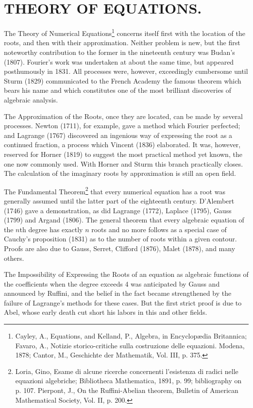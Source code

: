 \documentclass[oneside]{book}
\begin{document}
\chapter{THEORY OF EQUATIONS.}

The Theory of Numerical Equations\footnote{Cayley, A., Equations,
and Kelland, P., Algebra, in Encyclop\ae{}dia Britannica; Favaro, A.,
Notizie storico-critiche sulla costruzione delle equazioni. Modena,
1878; Cantor, M., Geschichte der Mathematik, Vol. III, p. 375.}
concerns itself first with the location of the roots, and then with
their approximation. Neither problem is new, but the first
noteworthy contribution to the former in the nineteenth century was
Budan's (1807). Fourier's work was undertaken at about the same
time, but appeared posthumously in 1831. All processes were,
however, exceedingly cumbersome until Sturm (1829) communicated to
the French Academy the famous theorem which bears his name and which
constitutes one of the most brilliant discoveries of algebraic
analysis.

The Approximation of the Roots, once they are located, can be made
by several processes. Newton (1711), for example, gave a method
which Fourier perfected; and Lagrange (1767) discovered an ingenious
way of expressing the root as a continued fraction, a process which
Vincent (1836) elaborated. It was, however, reserved for Horner
(1819) to suggest the most practical method yet known, the one now
commonly used. With Horner and Sturm this branch practically
closes. The calculation of the imaginary roots by approximation is
still an open field.

The Fundamental Theorem\footnote{Loria, Gino, Esame di alcune
ricerche concernenti l'esistenza di radici nelle equazioni
algebriche; Bibliotheca Mathematica, 1891, p. 99; bibliography on
p. 107. Pierpont, J., On the Ruffini-Abelian theorem, Bulletin of
American Mathematical Society, Vol. II, p. 200.} that every
numerical equation has a root was generally assumed until the latter
part of the eighteenth century. D'Alembert (1746) gave a
demonstration, as did Lagrange (1772), Laplace (1795), Gauss (1799)
and Argand (1806). The general theorem that every algebraic equation
of the $n$th degree has exactly $n$ roots and no more follows as a
special case of Cauchy's proposition (1831) as to the number of
roots within a given contour. Proofs are also due to Gauss, Serret,
Clifford (1876), Malet (1878), and many others.

The Impossibility of Expressing the Roots of an equation as
algebraic functions of the coefficients when the degree exceeds 4
was anticipated by Gauss and announced by Ruffini, and the belief in
the fact became strengthened by the failure of Lagrange's methods
for these cases. But the first strict proof is due to Abel, whose
early death cut short his labors in this and other fields.
\end{document}
